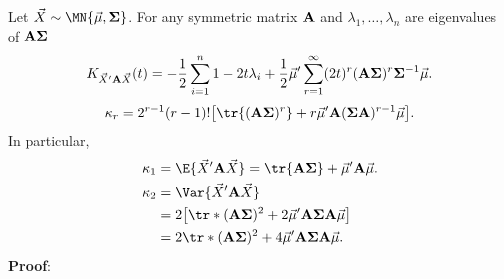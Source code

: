 \begin{Theorem}{}{}
    Let $ \Vector{X} \sim \MN{\Vector{\mu},\Matrix{\Sigma}} $. For any symmetric
    matrix $ \mathbf{A} $ and $ \lambda_1,\ldots,\lambda_n $ are eigenvalues of $ \mathbf{A\Sigma} $
    \[ K_{\vec{X}'\mathbf{A}\vec{X}}(t)
        =-\frac{1}{2}\sum_{i=1}^{n}\relax{1-2t\lambda_i}+\frac{1}{2}\vec{\mu}' \sum_{r=1}^{\infty}(2t)^r(\mathbf{A\Sigma})^r \mathbf{\Sigma}^{-1}\vec{\mu}. \]
    \[ \kappa_r=2^{r-1}(r-1)!\bigl[\tr{(\Matrix{A\Sigma})^r}+r \Vector{\mu}' \Matrix{A}(\Matrix{\Sigma A})^{r-1}\Vector{\mu}\bigr]. \]
    In particular,
    \begin{align*}
        \kappa_1 & =\E{\Vector{X}'\Matrix{A}\Vector{X}}=\tr{\Matrix{A\Sigma}}+\Vector{\mu}'\Matrix{A}\Vector{\mu}.  \\
        \kappa_2 & =\Var{\Vector{X}'\Matrix{A}\Vector{X}}                                                           \\
                 & =2\bigl[\tr*{(\Matrix{A\Sigma})^2}+2 \Vector{\mu}'\Matrix{A}\Matrix{\Sigma A}\Vector{\mu} \bigr] \\
                 & =2\tr*{(\Matrix{A\Sigma})^2}+4\Vector{\mu}'\Matrix{A\Sigma A}\Vector{\mu}.
    \end{align*}
    \tcblower{}
    \textbf{Proof}:


\end{Theorem}
